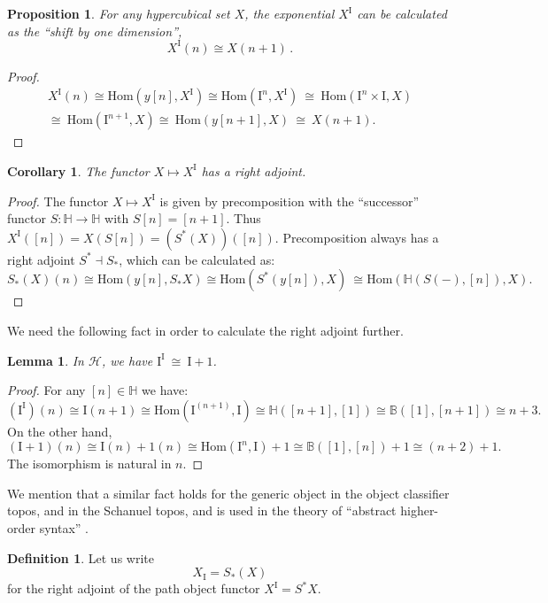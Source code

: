 \documentclass[11pt]{article}
\newcommand{\B}{\ensuremath{\mathbb{B}}}
\newcommand{\Hom}{\ensuremath{\mathrm{Hom}}}
\renewcommand{\hom}{\ensuremath{\mathrm{Hom}}}
\newcommand{\I}{\ensuremath{\mathrm{I}}}
\renewcommand{\H}{\ensuremath{\mathbb{H}}}
\newcommand{\HH}{\ensuremath{\mathcal{H}}}
\newtheorem{proposition}[theorem]{Proposition}
\newtheorem{lemma}[theorem]{Lemma}
\newtheorem{corollary}[theorem]{Corollary}
\theoremstyle{remark}
\theoremstyle{definition}
\newtheorem{definition}[theorem]{Definition}
\begin{document}
\begin{proposition}\label{prop:pathobject}
For any hypercubical set $X$, the exponential $X^\I$ can be calculated as the ``shift by one dimension'', 
\[
X^\I(n) \cong X(n+1)\,.
\]
\end{proposition}

\begin{proof}
\[
\begin{split}
X^\I(n) \cong \hom(y[n], X^\I) \cong \hom(\I^n, X^\I)\ \cong\ \hom(\I^n\times \I, X)\\
\cong\ \hom(\I^{n+1}, X)\cong\ \hom(y[n+1], X)\ \cong\ X(n+1).
\end{split}
\]
\end{proof}

\begin{corollary}\label{cor:rightadjpath}
The functor $X \mapsto X^\I$ has a \emph{right} adjoint.
\end{corollary}
\begin{proof}
The functor $X \mapsto X^\I$ is given by precomposition with the ``successor'' functor $S : \H\to\H$ with $S[n] = [n+1]$.  Thus $X^\I([n]) = X(S[n]) = (S^*(X))([n])$.  Precomposition always has a right adjoint $S^* \dashv S_*$, which can be calculated as:
\[
S_*(X)(n) \cong \hom(y[n], S_*X) \cong \hom(S^*(y[n]), X)\ \cong \hom(\H(S(-), [n]), X).
\]
\end{proof}

We need the following fact in order to calculate the right adjoint further.

\begin{lemma}\label{lemma:binomial}
In $\HH$, we have $\I^\I\ \cong\ \I+1$.
\end{lemma}
\begin{proof}
For any $[n] \in \H$ we have:
\[
(\I^\I)(n) \cong \I(n+1) \cong \Hom(\I^{(n+1)},\I)\cong \H([n+1],[1])\cong \B([1], [n+1])\cong n+3.
\]
On the other hand,
\[
(\I+1)(n) \cong \I(n) + 1(n) \cong \Hom(\I^n, \I) + 1 \cong \B([1],[n]) +1 \cong (n+2) +1.
\]
The isomorphism is natural in $n$.
\end{proof}
%
We mention that a similar fact holds for the generic object in the object classifier topos, and in the Schanuel topos, and is used in the theory of ``abstract higher-order syntax'' \cite{Pitts,Fiore}.


\begin{definition}
Let us write
\[
X_\I = S_*(X)
\]
for the right adjoint of the path object functor $X^\I = S^*X$.
\end{definition}
\end{document}
